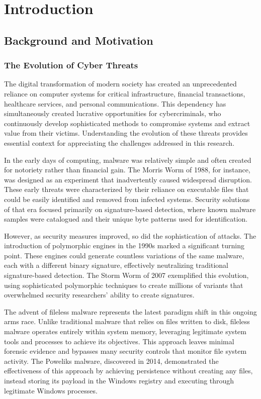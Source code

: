 \chapter{Introduction}
\label{ch:introduction}

\section{Background and Motivation}
\label{sec:background}

\subsection{The Evolution of Cyber Threats}
\label{subsec:cyber_evolution}

The digital transformation of modern society has created an unprecedented reliance on computer systems for critical infrastructure, financial transactions, healthcare services, and personal communications. This dependency has simultaneously created lucrative opportunities for cybercriminals, who continuously develop sophisticated methods to compromise systems and extract value from their victims. Understanding the evolution of these threats provides essential context for appreciating the challenges addressed in this research.

In the early days of computing, malware was relatively simple and often created for notoriety rather than financial gain. The Morris Worm of 1988, for instance, was designed as an experiment that inadvertently caused widespread disruption. These early threats were characterized by their reliance on executable files that could be easily identified and removed from infected systems. Security solutions of that era focused primarily on signature-based detection, where known malware samples were catalogued and their unique byte patterns used for identification.

However, as security measures improved, so did the sophistication of attacks. The introduction of polymorphic engines in the 1990s marked a significant turning point. These engines could generate countless variations of the same malware, each with a different binary signature, effectively neutralizing traditional signature-based detection. The Storm Worm of 2007 exemplified this evolution, using sophisticated polymorphic techniques to create millions of variants that overwhelmed security researchers' ability to create signatures.

The advent of fileless malware represents the latest paradigm shift in this ongoing arms race. Unlike traditional malware that relies on files written to disk, fileless malware operates entirely within system memory, leveraging legitimate system tools and processes to achieve its objectives. This approach leaves minimal forensic evidence and bypasses many security controls that monitor file system activity. The Poweliks malware, discovered in 2014, demonstrated the effectiveness of this approach by achieving persistence without creating any files, instead storing its payload in the Windows registry and executing through legitimate Windows processes.

